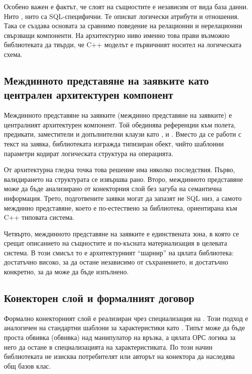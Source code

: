 Особено важен е фактът, че слоят на същностите е независим от вида база данни. Нито , нито  са SQL-специфични. Те описват логически атрибути и отношения. Така се създава основата за сравнимо поведение на релационни и нерелационни свързващи компоненти. На архитектурно ниво именно това прави възможно библиотеката да твърди, че C++ моделът е първичният носител на логическата схема.

\subsection{Междинното представяне на заявките като централен архитектурен компонент}

Междинното представяне на заявките (междинно представяне на заявките) е централният архитектурен компонент. Той обединява референции към полета, предикати, заместители и допълнителни клаузи като ,  и . Вместо да се работи с текст на заявка, библиотеката изгражда типизиран обект, чийто шаблонни параметри кодират логическата структура на операцията.

От архитектурна гледна точка това решение има няколко последствия. Първо, валидирането на структурата се извършва рано. Второ, междинното представяне може да бъде анализирано от конекторния слой без загуба на семантична информация. Трето, подготвените заявки могат да запазят не SQL низ, а самото междинно представяне, което е по-естествено за библиотека, ориентирана към C++ типовата система.

Четвърто, междинното представяне на заявките е единствената зона, в която се срещат описанието на същностите и по-късната материализация в целевата система. В този смисъл то е архитектурният ``шарнир'' на цялата библиотека: достатъчно високо, за да остане независимо от съхранението, и достатъчно конкретно, за да може да бъде изпълнено.

\subsection{Конекторен слой и формалният договор}

Формално конекторният слой е реализиран чрез специализация на . Този подход е аналогичен на стандартни шаблони за характеристики като . Типът  може да бъде проста обвивка (обвивка) над манипулатор на връзка, а цялата ОРС логика за него да остане в специализацията на характеристиката. По този начин библиотеката не изисква потребителят или авторът на конектора да наследява общ базов клас.

